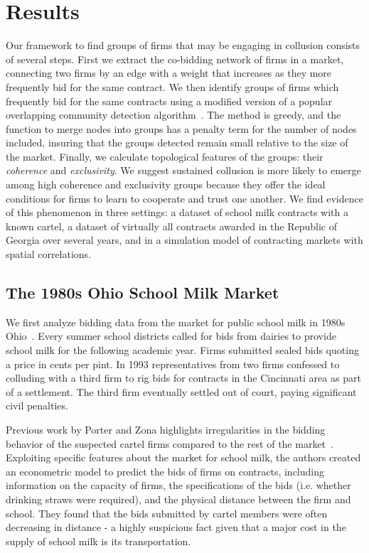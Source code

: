 \section{Results}
Our framework to find groups of firms that may be engaging in collusion consists of several steps. First we extract the co-bidding network of firms in a market, connecting two firms by an edge with a weight that increases as they more frequently bid for the same contract. We then identify groups of firms which frequently bid for the same contracts using a modified version of a popular overlapping community detection algorithm~\cite{lancichinetti2009detecting}. The method is greedy, and the function to merge nodes into groups has a penalty term for the number of nodes included, insuring that the groups detected remain small relative to the size of the market. Finally, we calculate topological features of the groups: their \textit{coherence} and \textit{exclusivity}. We suggest sustained collusion is more likely to emerge among high coherence and exclusivity groups because they offer the ideal conditions for firms to learn to cooperate and trust one another. We find evidence of this phenomenon in three settings: a dataset of school milk contracts with a known cartel, a dataset of virtually all contracts awarded in the Republic of Georgia over several years, and in a simulation model of contracting markets with spatial correlations.

\subsection{The 1980s Ohio School Milk Market}
We first analyze bidding data from the market for public school milk in 1980s Ohio~\cite{porter1999ohio}. Every summer school districts called for bids from dairies to provide school milk for the following academic year. Firms submitted sealed bids quoting a price in cents per pint. In 1993 representatives from two firms confessed to colluding with a third firm to rig bids for contracts in the Cincinnati area as part of a settlement. The third firm eventually settled out of court, paying significant civil penalties.

Previous work by Porter and Zona highlights irregularities in the bidding behavior of the suspected cartel firms compared to the rest of the market~\cite{porter1999ohio}. Exploiting specific features about the market for school milk, the authors created an econometric model to predict the bids of firms on contracts, including information on the capacity of firms, the specifications of the bids (i.e. whether drinking straws were required), and the physical distance between the firm and school. They found that the bids submitted by cartel members were often decreasing in distance - a highly suspicious fact given that a major cost in the supply of school milk is its transportation.

